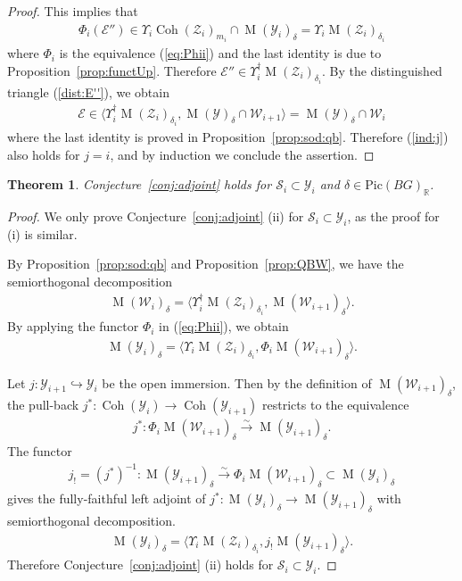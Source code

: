 \documentclass [11pt,oneside,a4paper,mathscr]{amsart}
\newtheorem{thm}{Theorem}[section]
\theoremstyle{definition}
\newcommand{\E}{\mathcal{E}}
\newcommand{\Y}{\mathcal{Y}}
\newcommand{\sS}{\mathcal{S}}
\newcommand{\zZ}{\mathcal{Z}}
\newcommand{\MM}{\operatorname{M}}
\newcommand{\Coh}{\operatorname{Coh}}
\begin{document}
\begin{proof}
This implies that 
\begin{align*}
    \Phi_i(\E'') \in \Upsilon_i \Coh(\zZ_i)_{m_i} \cap \MM(\Y_i)_{\delta}=
    \Upsilon_i \MM(\zZ_i)_{\delta_i}
\end{align*}
where $\Phi_i$ is the equivalence (\ref{eq:Phii}) and the last identity is due to Proposition~\ref{prop:functUp}. 
Therefore $\E'' \in \Upsilon_i^{\dag}\MM(\zZ_i)_{\delta_i}$. 
By the distinguished triangle (\ref{dist:E''}),
we obtain 
\begin{align*}
    \E \in \langle \Upsilon_i^{\dag}\MM(\zZ_i)_{\delta_i}, \MM(\Y)_{\delta} \cap \mathcal{W}_{i+1}
    \rangle =\MM(\Y)_{\delta} \cap \mathcal{W}_i
\end{align*}
where the last identity is proved in Proposition~\ref{prop:sod:qb}. 
Therefore (\ref{ind:j}) also holds for $j=i$, and by induction 
we conclude the assertion. 
\end{proof}

\begin{thm}\label{thm:qstack}
Conjecture~\ref{conj:adjoint} holds for $\sS_i \subset \Y_i$
and $\delta \in \mathrm{Pic}(BG)_{\mathbb{R}}$.  
\end{thm}
\begin{proof}
We only prove Conjecture~\ref{conj:adjoint} (ii) 
for $\sS_i \subset \Y_i$, as the proof for (i) is similar. 

	By Proposition~\ref{prop:sod:qb} and Proposition~\ref{prop:QBW}, we have the 
	semiorthogonal decomposition 
    \begin{align*}
        \MM(\mathcal{W}_i)_{\delta}=\langle \Upsilon_i^{\dag}\MM(\mathcal{Z}_i)_{\delta_i},  \MM(\mathcal{W}_{i+1})_{\delta} \rangle. 
    \end{align*}
    By applying the functor $\Phi_i$ in (\ref{eq:Phii}), we obtain 
	\begin{align*}
		\MM(\Y_{i})_{\delta}=\langle \Upsilon_i \MM(\zZ_i)_{\delta_i}, \Phi_i \MM(\mathcal{W}_{i+1})_{\delta}\rangle. 
		\end{align*}
        
Let $j \colon \Y_{i+1} \hookrightarrow \Y_i$ be the open immersion.   
Then by the definition of $\MM(\mathcal{W}_{i+1})_{\delta}$, 
the pull-back $j^{\ast} \colon \Coh(\Y_i) \to \Coh(\Y_{i+1})$ restricts to the 
equivalence 
\begin{align*}
	j^{\ast} \colon \Phi_i \MM(\mathcal{W}_{i+1})_{\delta} \stackrel{\sim}{\to} 
	\MM(\Y_{i+1})_{\delta}. 
	\end{align*}  
The functor 
\begin{align*}j_{!}=(j^{\ast})^{-1} \colon 
	\MM(\Y_{i+1})_{\delta} \stackrel{\sim}{\to} \Phi_i \MM(\mathcal{W}_{i+1})_{\delta}
	\subset \MM(\Y_{i})_{\delta}
	\end{align*}
gives the fully-faithful left adjoint of $j^{\ast} \colon \MM(\Y_{i})_{\delta} \to \MM(\Y_{i+1})_{\delta}$ with semiorthogonal decomposition. 
\begin{align*}
		\MM(\Y_{i})_{\delta}=\langle \Upsilon_i \MM(\zZ_i)_{\delta_i}, j_{!}\MM(\Y_{i+1})_{\delta}\rangle. 
	\end{align*}
    Therefore Conjecture~\ref{conj:adjoint} (ii) holds for $\mathcal{S}_i \subset \mathcal{Y}_i$. 
\end{proof}
\end{document}
